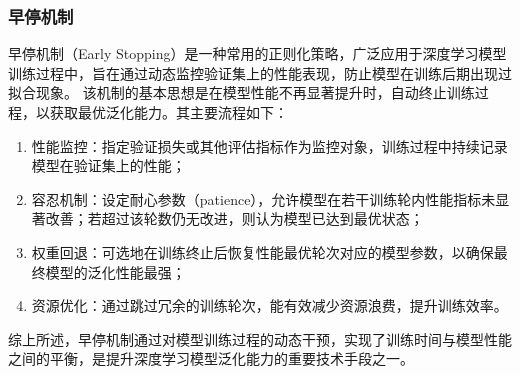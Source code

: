 \subsubsection{早停机制}
早停机制（Early Stopping）是一种常用的正则化策略，广泛应用于深度学习模型训练过程中，旨在通过动态监控验证集上的性能表现，防止模型在训练后期出现过拟合现象。
该机制的基本思想是在模型性能不再显著提升时，自动终止训练过程，以获取最优泛化能力。其主要流程如下：
\begin{enumerate}[label={（\arabic*）}, leftmargin=2em, labelsep=0.5em, itemsep=0pt]
\item 性能监控：指定验证损失或其他评估指标作为监控对象，训练过程中持续记录模型在验证集上的性能；
\item 容忍机制：设定耐心参数（patience），允许模型在若干训练轮内性能指标未显著改善；若超过该轮数仍无改进，则认为模型已达到最优状态；
\item 权重回退：可选地在训练终止后恢复性能最优轮次对应的模型参数，以确保最终模型的泛化性能最强；
\item 资源优化：通过跳过冗余的训练轮次，能有效减少资源浪费，提升训练效率。
\end{enumerate}
综上所述，早停机制通过对模型训练过程的动态干预，实现了训练时间与模型性能之间的平衡，是提升深度学习模型泛化能力的重要技术手段之一。